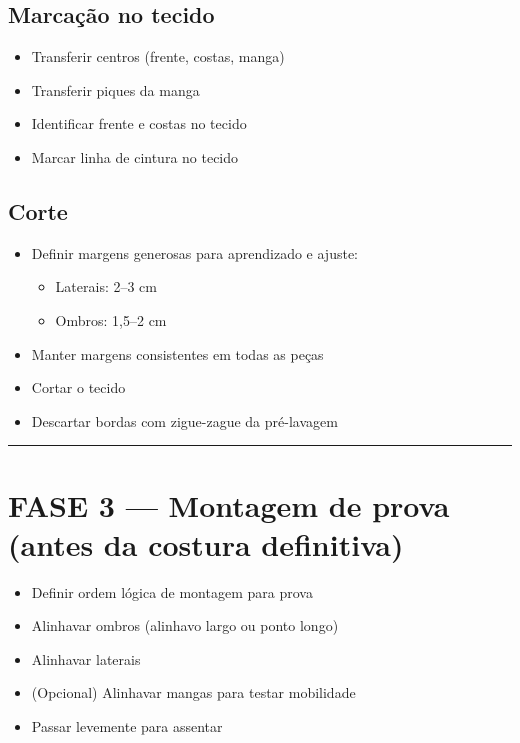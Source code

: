 \documentclass[
  brazilian,
  8pt,
  oneside]{book}
\providecommand{\tightlist}{%
  \setlength{\itemsep}{0pt}\setlength{\parskip}{0pt}}
\begin{document}
\subsection{Marcação no tecido}\label{marcauxe7uxe3o-no-tecido}

\begin{itemize}
\tightlist
\item[$\square$]
  Transferir centros (frente, costas, manga)
\item[$\square$]
  Transferir piques da manga
\item[$\square$]
  Identificar frente e costas no tecido
\item[$\square$]
  Marcar linha de cintura no tecido
\end{itemize}

\subsection{Corte}\label{corte}

\begin{itemize}
\tightlist
\item[$\square$]
  Definir margens generosas para aprendizado e ajuste:

  \begin{itemize}
  \tightlist
  \item[$\square$]
    Laterais: 2--3 cm
  \item[$\square$]
    Ombros: 1,5--2 cm
  \end{itemize}
\item[$\square$]
  Manter margens consistentes em todas as peças
\item[$\square$]
  Cortar o tecido
\item[$\square$]
  Descartar bordas com zigue-zague da pré-lavagem
\end{itemize}

\begin{center}\rule{0.5\linewidth}{0.5pt}\end{center}

\section{FASE 3 --- Montagem de prova (antes da costura definitiva)}\label{fase-3-montagem-de-prova-antes-da-costura-definitiva}

\begin{itemize}
\tightlist
\item[$\square$]
  Definir ordem lógica de montagem para prova
\item[$\square$]
  Alinhavar ombros (alinhavo largo ou ponto longo)
\item[$\square$]
  Alinhavar laterais
\item[$\square$]
  (Opcional) Alinhavar mangas para testar mobilidade
\item[$\square$]
  Passar levemente para assentar
\end{itemize}
\end{document}
